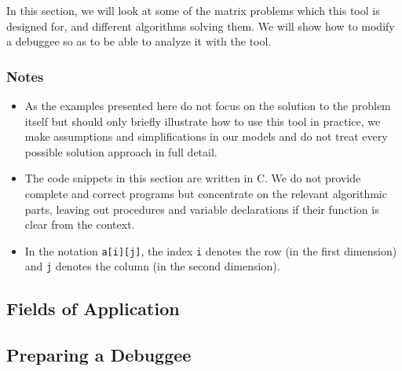 In this section, we will look at some of the matrix problems which this tool is designed for, and different algorithms solving them. We will show how to modify a debuggee so as to be able to analyze it with the tool.

\subsubsection*{Notes}
\begin{itemize}
\item As the examples presented here do not focus on the solution to the problem itself but should only briefly illustrate how to use this tool in practice, we make assumptions and simplifications in our models and do not treat every possible solution approach in full detail.

\item The code snippets in this section are written in C. We do not provide complete and correct programs but concentrate on the relevant algorithmic parts, leaving out procedures and variable declarations if their function is clear from the context.

\item In the notation \texttt{a[i][j]}, the index \texttt{i} denotes the row (in the first dimension) and \texttt{j} denotes the column (in the second dimension).
\end{itemize}


\subsection{Fields of Application}


\subsection{Preparing a Debuggee}


